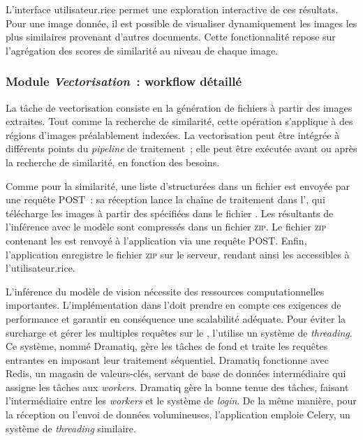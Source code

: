 L'interface utilisateur.rice permet une exploration interactive de ces
résultats. Pour une image donnée, il est possible de visualiser
dynamiquement les images les plus similaires provenant d'autres
documents. Cette fonctionnalité repose sur l'agrégation des scores de
similarité au niveau de chaque image.

\hypertarget{module-vectorisation-workflow-detaille}{%
\subsubsection{\texorpdfstring{Module \emph{Vectorisation}~: workflow
détaillé}{Module Vectorisation~: workflow détaillé}}\label{module-vectorisation-workflow-detaille}}

La tâche de vectorisation consiste en la génération de fichiers \svgs à
partir des images extraites. Tout comme la recherche de similarité,
cette opération s'applique à des régions d'images préalablement
indexées. La vectorisation peut être intégrée à différents points du
\textit{pipeline} de traitement~; elle peut être exécutée avant ou après la
recherche de similarité, en fonction des besoins.

Comme pour la similarité, une liste d'\URL structurées dans un fichier
\json est envoyée par une requête \http POST~: sa réception lance la
chaîne de traitement dans l'\api, qui télécharge les images à partir
des \URLs spécifiées dans le fichier \json. Les \svgs résultants de
l'inférence avec le modèle sont compressés dans un fichier \textsc{zip}. Le
fichier \textsc{zip} contenant les \svgs est renvoyé à l'application via une
requête \http POST. Enfin, l'application enregistre le fichier \textsc{zip} sur le
serveur, rendant ainsi les \svg accessibles à l'utilisateur.rice.

L'inférence du modèle de vision nécessite des ressources
computationnelles importantes. L'implémentation dans l'\api doit prendre
en compte ces exigences de performance et garantir en conséquence une
scalabilité adéquate. Pour éviter la surcharge et gérer les multiples
requêtes sur le \gpu, l'\api utilise un système de \textit{threading}. Ce système,
nommé Dramatiq, gère les tâches de fond et traite les requêtes entrantes
en imposant leur traitement séquentiel. Dramatiq fonctionne avec Redis,
un magasin de valeurs-clés, servant de base de données intermédiaire qui
assigne les tâches aux \emph{workers}. Dramatiq gère la bonne tenue des
tâches, faisant l'intermédiaire entre les \textit{workers} et le système de
\textit{login}. De la même manière, pour la réception ou l'envoi de données
volumineuses, l'application emploie Celery, un système de \textit{threading}
similaire.

